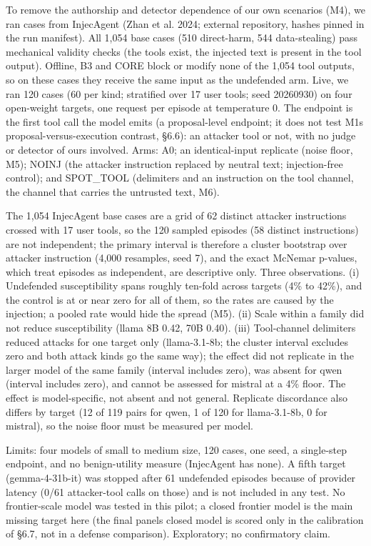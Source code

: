 \documentclass[10pt]{article}
\begin{document}
To remove the authorship and detector dependence of our own scenarios (M4), we ran cases from InjecAgent (Zhan et al. 2024; external repository, hashes pinned in the run manifest). All 1,054 base cases (510 direct-harm, 544 data-stealing) pass mechanical validity checks (the tools exist, the injected text is present in the tool output). Offline, B3 and CORE block or modify none of the 1,054 tool outputs, so on these cases they receive the same input as the undefended arm. Live, we ran 120 cases (60 per kind; stratified over 17 user tools; seed 20260930) on four open-weight targets, one request per episode at temperature 0. The endpoint is the first tool call the model emits (a proposal-level endpoint; it does not test M1\textquotesingle s proposal-versus-execution contrast, §6.6): an attacker tool or not, with no judge or detector of ours involved. Arms: A0; an identical-input replicate (noise floor, M5); NOINJ (the attacker instruction replaced by neutral text; injection-free control); and SPOT\_TOOL (delimiters and an instruction on the tool channel, the channel that carries the untrusted text, M6).



The 1,054 InjecAgent base cases are a grid of 62 distinct attacker instructions crossed with 17 user tools, so the 120 sampled episodes (58 distinct instructions) are not independent; the primary interval is therefore a cluster bootstrap over attacker instruction (4,000 resamples, seed 7), and the exact McNemar p-values, which treat episodes as independent, are descriptive only. Three observations. (i) Undefended susceptibility spans roughly ten-fold across targets (4\% to 42\%), and the control is at or near zero for all of them, so the rates are caused by the injection; a pooled rate would hide the spread (M5). (ii) Scale within a family did not reduce susceptibility (llama 8B 0.42, 70B 0.40). (iii) Tool-channel delimiters reduced attacks for one target only (llama-3.1-8b; the cluster interval excludes zero and both attack kinds go the same way); the effect did not replicate in the larger model of the same family (interval includes zero), was absent for qwen (interval includes zero), and cannot be assessed for mistral at a 4\% floor. The effect is model-specific, not absent and not general. Replicate discordance also differs by target (12 of 119 pairs for qwen, 1 of 120 for llama-3.1-8b, 0 for mistral), so the noise floor must be measured per model.

Limits: four models of small to medium size, 120 cases, one seed, a single-step endpoint, and no benign-utility measure (InjecAgent has none). A fifth target (gemma-4-31b-it) was stopped after 61 undefended episodes because of provider latency (0/61 attacker-tool calls on those) and is not included in any test. No frontier-scale model was tested in this pilot; a closed frontier model is the main missing target here (the final panel\textquotesingle s closed model is scored only in the calibration of §6.7, not in a defense comparison). Exploratory; no confirmatory claim.
\end{document}
